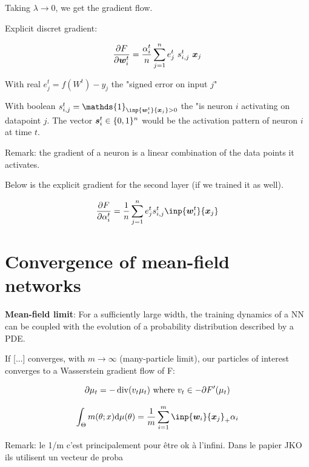 Taking $\lambda \rightarrow 0$, we get the gradient flow.

Explicit discret gradient:

\begin{equation}
	\frac{\partial F}{\partial {\bm{w}}^t_i} = \frac{\alpha^t_i}{n} \sum_{j=1}^{n} e^t_j ~ s^t_{i, j} ~ {\bm{x}}_j
\end{equation}

With real $e^t_j = f(W^t) - y_j$ the "signed error on input $j$"

With boolean $s^t_{i, j} = \mathds{1}_{\inp{\vw^t_i}{\vx_j} > 0}$ the "is neuron $i$ activating on datapoint $j$. The vector ${\bm{s}}^t_{i} \in \{0, 1\}^n$ would be the activation pattern of neuron $i$ at time $t$.


Remark: the gradient of a neuron is a linear combination of the data points it activates.

Below is the explicit gradient for the second layer (if we trained it as well).

\begin{equation}
	\frac{\partial F}{\partial \alpha^t_i} =  \frac{1}{n} \sum_{j=1}^{n} e^t_j s^t_{i, j} \inp{\vw^t_i}{\vx_j}
\end{equation}

\section{Convergence of mean-field networks}

\textbf{Mean-field limit}\citep{chizatGlobalConvergenceGradient2018}: For a sufficiently large width, the training dynamics of a NN can be coupled with the evolution of a probability distribution described by a PDE.

If [...] converges, with $m \rightarrow \infty$ (many-particle limit), our particles of interest converges to a Wasserstein gradient flow of F:

\begin{equation}
	\partial \mu_t = - \operatorname*{div}(v_t \mu_t) \text{ where } v_t \in - \partial F'(\mu_t)
\end{equation}

\begin{equation}
	\int_\Theta m(\theta; x) \dd \mu(\theta) = \frac{1}{m} \sum_{i=1}^{m} \inp{\vw_i}{\vx_j}_+ \alpha_i
\end{equation}

Remark: le 1/m c'est principalement pour être ok à l'infini. Dans le papier JKO \citep{carlierConvergenceEntropicSchemes2017} ils utilisent un vecteur de proba

